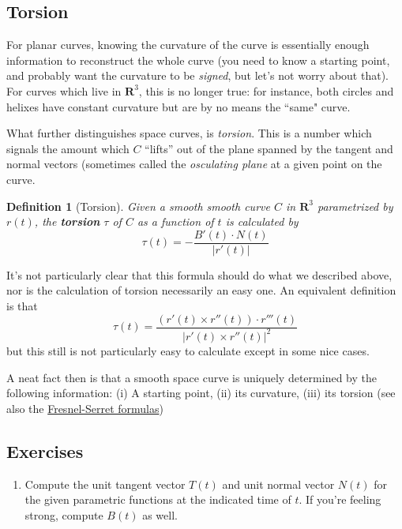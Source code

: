 \documentclass[12pt]{article}
\numberwithin{equation}{subsection}
\numberwithin{figure}{subsection}
\newtheorem{defn}[subsection]{Definition}
\theoremstyle{note}
\begin{document}
{\subsection{Torsion} For planar curves, knowing the curvature of the curve is essentially enough information to reconstruct the whole curve (you need to know a starting point, and probably want the curvature to be \textit{signed}, but let's not worry about that). For curves which live in $\mathbf{R}^3$, this is no longer true: for instance, both circles and helixes have constant curvature but are by no means the ``same" curve. 

What further distinguishes space curves, is \textit{torsion}. This is a number which signals the amount which $C$ ``lifts'' out of the plane spanned by the tangent and normal vectors (sometimes called the \textit{osculating plane} at a given point on the curve. 
\begin{defn}[Torsion] Given a smooth smooth curve $C$ in $\mathbf{R}^3$ parametrized by $r(t)$, the \textbf{torsion} $\tau$ of $C$ as a function of $t$ is calculated by \begin{equation} \label{t1} 
	\tau(t)=- \dfrac{B'(t)\cdot N(t)}{|r'(t)|}\end{equation}
\end{defn}
It's not particularly clear that this formula should do what we described above, nor is the calculation of torsion necessarily an easy one. An equivalent definition is that \begin{equation} \tau(t)= \dfrac{ (r'(t) \times r''(t)) \cdot r'''(t)}{|r'(t)\times r''(t)|^2}\end{equation}
but this still is not particularly easy to calculate except in some nice cases.

A neat fact then is that a smooth space curve is uniquely determined by the following information: (i) A starting point, (ii) its curvature, (iii) its torsion (see also the  \href{https://en.wikipedia.org/wiki/Frenet\%E2\%80\%93Serret_formulas}{Fresnel-Serret formulas})

\subsection{Exercises}
\begin{enumerate}[label=\arabic*.]
\item Compute the unit tangent vector $T(t)$ and unit normal vector $N(t)$ for the given parametric functions at the indicated time of $t$. If you're feeling strong, compute $B(t)$ as well.


\end{enumerate}}
\end{document}
